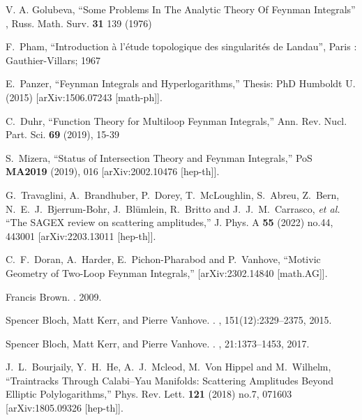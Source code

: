 \documentclass[a4paper,12pt]{article}
\numberwithin{equation}{section}
\numberwithin{figure}{section}
\begin{document}
\begin{thebibliography}{99}
  
 V. A. Golubeva, ``Some Problems In The Analytic
  Theory Of Feynman Integrals'' , Russ. Math. Surv. {\bf 31} 139 (1976)

 F.~Pham, ``Introduction \`a l'\'etude topologique des
  singularit\'es de Landau'', Paris : Gauthier-Villars; 1967

E.~Panzer,
``Feynman Integrals and Hyperlogarithms,''
Thesis: PhD Humboldt U. (2015)
[arXiv:1506.07243 [math-ph]].

C.~Duhr,
``Function Theory for Multiloop Feynman Integrals,''
Ann. Rev. Nucl. Part. Sci. \textbf{69} (2019), 15-39

S.~Mizera,
``Status of Intersection Theory and Feynman Integrals,''
PoS \textbf{MA2019} (2019), 016
[arXiv:2002.10476 [hep-th]].

G.~Travaglini, A.~Brandhuber, P.~Dorey, T.~McLoughlin, S.~Abreu, Z.~Bern, N.~E.~J.~Bjerrum-Bohr, J.~Bl\"umlein, R.~Britto and J.~J.~M.~Carrasco, \textit{et al.}
``The SAGEX review on scattering amplitudes,''
J. Phys. A \textbf{55} (2022) no.44, 443001
[arXiv:2203.13011 [hep-th]].

C.~F.~Doran, A.~Harder, E.~Pichon-Pharabod and P.~Vanhove,
``Motivic Geometry of Two-Loop Feynman Integrals,''
[arXiv:2302.14840 [math.AG]].


Francis Brown.
.
 2009.
\newblock [arXiv:0910.0114]  

Spencer Bloch, Matt Kerr, and Pierre Vanhove.
.
, 151(12):2329--2375, 2015.
\newblock [arXiv:1406.2664] 

Spencer Bloch, Matt Kerr, and Pierre Vanhove.
.
, 21:1373--1453, 2017.
\newblock [arXiv:1601.08181]

J.~L.~Bourjaily, Y.~H.~He, A.~J.~Mcleod, M.~Von Hippel and M.~Wilhelm,
``Traintracks Through Calabi--Yau Manifolds: Scattering Amplitudes Beyond Elliptic Polylogarithms,''
Phys. Rev. Lett. \textbf{121} (2018) no.7, 071603
[arXiv:1805.09326 [hep-th]].
  


\end{thebibliography}
\end{document}
